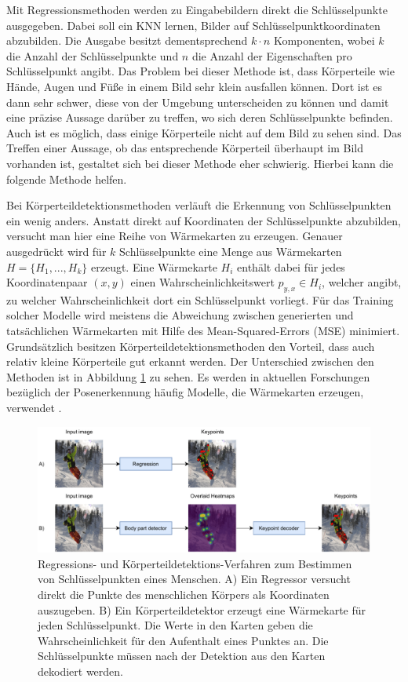 Mit Regressionsmethoden werden zu Eingabebildern direkt die Schlüsselpunkte
ausgegeben. Dabei soll ein KNN lernen, Bilder auf Schlüsselpunktkoordinaten
abzubilden. Die Ausgabe besitzt dementsprechend $k \cdot n$ Komponenten, wobei
$k$ die Anzahl der Schlüsselpunkte und $n$ die Anzahl der Eigenschaften pro
Schlüsselpunkt angibt. Das Problem bei dieser Methode ist, dass Körperteile wie
Hände, Augen und Füße in einem Bild sehr klein ausfallen können. Dort ist es
dann sehr schwer, diese von der Umgebung unterscheiden zu können und damit eine
präzise Aussage darüber zu treffen, wo sich deren Schlüsselpunkte befinden.
Auch ist es möglich, dass einige Körperteile nicht auf dem Bild zu sehen sind.
Das Treffen einer Aussage, ob das entsprechende Körperteil überhaupt im Bild
vorhanden ist, gestaltet sich bei dieser Methode eher schwierig. Hierbei kann
die folgende Methode helfen.

Bei Körperteildetektionsmethoden verläuft die Erkennung von Schlüsselpunkten ein
wenig anders. Anstatt direkt auf Koordinaten der Schlüsselpunkte abzubilden,
versucht man hier eine Reihe von Wärmekarten zu erzeugen. Genauer ausgedrückt
wird für $k$ Schlüsselpunkte eine Menge aus Wärmekarten $H = \{H_1, ..., H_k\}$
erzeugt. Eine Wärme\-karte $H_i$ enthält dabei für jedes Koordinatenpaar $(x, y)$
einen Wahrscheinlichkeitswert $p_{y, x} \in H_i$, welcher angibt, zu welcher
Wahrscheinlichkeit dort ein Schlüsselpunkt vorliegt.  Für das Training solcher
Modelle wird meistens die Abweichung zwischen generierten und tatsächlichen
Wärmekarten mit Hilfe des Mean-Squared-Errors (MSE) minimiert. Grund\-sätz\-lich
besitzen Körperteildetektionsmethoden den Vorteil, dass auch relativ kleine
Körperteile gut erkannt werden. Der Unterschied zwischen den Methoden ist in
Abbildung \ref{fig:pose-detection} zu sehen. Es werden in aktuellen Forschungen
bezüglich der Posenerkennung häufig Modelle, die Wärmekarten erzeugen, verwendet
\cite{zheng2021deep}.

\begin{figure}
    \includegraphics[width=\textwidth]{images/pose_detection.pdf}
    \caption{Regressions- und Körperteildetektions-Verfahren
    zum Be\-stim\-men von Schlüs\-sel\-punk\-ten eines Menschen. A) Ein Regressor
    versucht direkt die Punkte des menschlichen Körpers als Koordinaten
    auszugeben. B) Ein Körper\-teil\-detektor erzeugt eine Wärmekarte für jeden
    Schlüsselpunkt. Die Werte in den Karten geben die Wahrscheinlichkeit für den
    Aufenthalt eines Punktes an. Die Schlüsselpunkte müssen nach der Detektion aus den Karten dekodiert werden.}
    \label{fig:pose-detection}
\end{figure}

